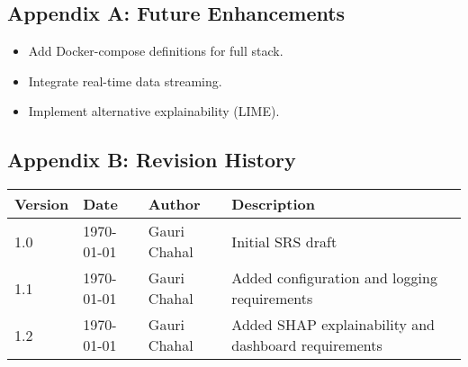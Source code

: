 \documentclass[15pt]{article}
\begin{document}
\subsection{Appendix A: Future Enhancements}
\begin{itemize}
  \item Add Docker-compose definitions for full stack.
  \item Integrate real-time data streaming.
  \item Implement alternative explainability (LIME).
\end{itemize}

\subsection{Appendix B: Revision History}
\begin{tabular}{|l|l|l|l|}
\hline
Version & Date & Author & Description \\
\hline
1.0 & \today & Gauri Chahal & Initial SRS draft \\
\hline
1.1 & \today & Gauri Chahal & Added configuration and logging requirements \\
\hline
1.2 & \today & Gauri Chahal & Added SHAP explainability and dashboard requirements \\
\hline
\end{tabular}
\end{document}
